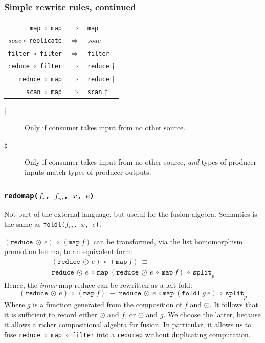 \documentclass{beamer}
\begin{document}
\begin{frame}[fragile]
  \frametitle{Simple rewrite rules, continued}

  \begin{center}
    \begin{tabular}{rcl}
      \texttt{map $\circ$ map}    & $\Rightarrow$ & \texttt{map} \\
      \textit{soac} $\circ$ \texttt{replicate} & $\Rightarrow$ & \textit{soac} \\
      \texttt{filter $\circ$ filter} & $\Rightarrow$ & \texttt{filter}  \\
      \texttt{reduce $\circ$ filter} & $\Rightarrow$ & \texttt{reduce} $\dag$  \\
      \texttt{reduce $\circ$ map} & $\Rightarrow$ & \texttt{reduce} $\ddag$ \\
      \texttt{scan $\circ$ map} & $\Rightarrow$ & \texttt{scan} $\ddag$ \\
    \end{tabular}
  \end{center}

  \begin{description}
  \item[$\dag$] Only if consumer takes input from no other
    source.
  \item[$\ddag$] Only if consumer takes input from no other source,
    \textit{and} types of producer inputs match types of producer
    outputs.
  \end{description}

\end{frame}

\begin{frame}[fragile,t]
  \frametitle{  \texttt{redomap($f_{r}$, $f_{m}$, $x$, $e$)}}

  Not part of the external language, but useful for the fusion
  algebra.  Semantics is the same as \texttt{\tt foldl($f_{m}$, $x$, $e$)}.

  $(\texttt{reduce}\ \odot\ e)\ \circ\ (\texttt{map}\ f)$ can be
  transformed, via the list homomorphism promotion lemma, to an
  equivalent form:
  \begin{gather*}
    (\texttt{reduce}\ \odot\ e)\ \circ\ (\texttt{map}\ f)\ {\equiv}\\
    \texttt{reduce}\ \odot\
    e\ \circ\ \texttt{map}\ ({\texttt{reduce}\ \odot\ e\ \circ\ \texttt{map}\ f})\ \circ\ \texttt{split}_{p}
  \end{gather*}
  Hence, the \textit{inner} map-reduce can be rewritten as a left-fold:
  \[
  (\texttt{reduce}\ \odot\ e)\ \circ\ (\texttt{map}\ f)\
  {\equiv}\ \texttt{reduce}\ \odot\
  e\ \circ \texttt{map} \ ({\texttt{foldl}\ g\ e})\ \circ\ \texttt{split}_{p}
  \]
  Where $g$ is a function generated from the composition of $f$ and
  $\odot$.  It follows that it is sufficient to record either $\odot$
  and $f$, or $\odot$ and $g$. We choose the latter, because it allows
  a richer compositional algebra for fusion.  In particular, it allows
  us to fuse \texttt{reduce~$\circ$~map~$\circ$~filter} into a
  \texttt{redomap} without duplicating computation.
\end{frame}
\end{document}
